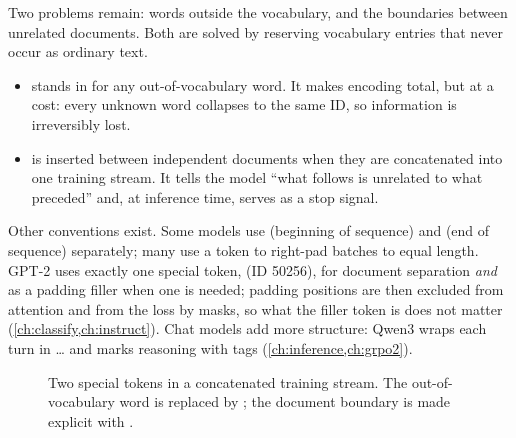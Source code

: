 Two problems remain: words outside the vocabulary, and the boundaries between unrelated documents.
Both are solved by reserving vocabulary entries that never occur as ordinary text.
\begin{itemize}
  \item {} stands in for any out-of-vocabulary word. It makes encoding total, but at a
  cost: every unknown word collapses to the same ID, so information is irreversibly lost.
  \item {} is inserted between independent documents when they are concatenated
  into one training stream. It tells the model ``what follows is unrelated to what preceded'' and,
  at inference time, serves as a stop signal.
\end{itemize}

Other conventions exist. Some models use \code{[BOS]} (beginning of sequence) and \code{[EOS]}
(end of sequence) separately; many use a \code{[PAD]} token to right-pad batches to equal length.
GPT-2 uses exactly one special token,  (ID 50256), for document separation
\emph{and} as a padding filler when one is needed; padding positions are then excluded from
attention and from the loss by masks, so what the filler token is does not matter
(\cref{ch:classify,ch:instruct}). Chat models add more structure: Qwen3 wraps each turn in
 \dots {} and marks reasoning with  tags
(\cref{ch:inference,ch:grpo2}).

\begin{figure}[t]
\centering
{}
\caption{Two special tokens in a concatenated training stream. The out-of-vocabulary word is
replaced by ; the document boundary is made explicit with .}
\label{fig:text:special}
\end{figure}

